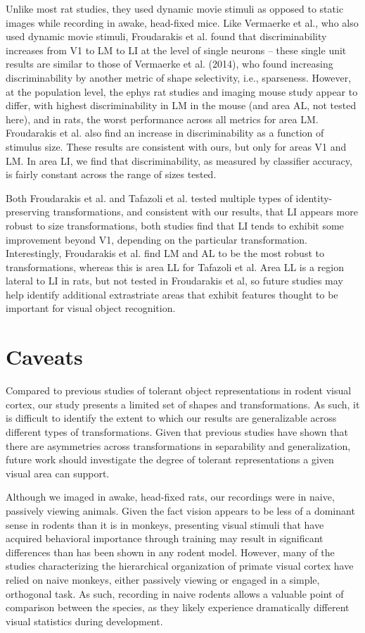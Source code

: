 Unlike most rat studies, they used dynamic movie stimuli as opposed to static images while recording in awake, head-fixed mice. Like Vermaerke et al., who also used dynamic movie stimuli, Froudarakis et al. found that discriminability increases from V1 to LM to LI at the level of single neurons -- these single unit results are similar to those of Vermaerke et al. (2014), who found increasing discriminability by another metric of shape selectivity, i.e., sparseness. However, at the population level, the ephys rat studies and imaging mouse study appear to differ, with highest discriminability in LM in the mouse (and area AL, not tested here), and in rats, the worst performance across all metrics for area LM. Froudarakis et al. also find an increase in discriminability as a function of stimulus size. These results are consistent with ours, but only for areas V1 and LM. In area LI, we find that discriminability, as measured by classifier accuracy, is fairly constant across the range of sizes tested. 

Both Froudarakis et al. and Tafazoli et al. tested multiple types of identity-preserving transformations, and consistent with our results, that LI appears more robust to size transformations, both studies find that LI tends to exhibit some improvement beyond V1, depending on the particular transformation. Interestingly, Froudarakis et al. find LM and AL to be the most robust to transformations, whereas this is area LL for Tafazoli et al. Area LL is a region lateral to LI in rats, but not tested in Froudarakis et al, so future studies may help identify additional extrastriate areas that exhibit features thought to be important for visual object recognition.  

\section{Caveats}
Compared to previous studies of tolerant object representations in rodent visual cortex, our study presents a limited set of shapes and transformations. As such, it is difficult to identify the extent to which our results are generalizable across different types of transformations. Given that previous studies have shown that there are asymmetries across transformations in separability and generalization, future work should investigate the degree of tolerant representations a given visual area can support. 

Although we imaged in awake, head-fixed rats, our recordings were in naive, passively viewing animals. Given the fact vision appears to be less of a dominant sense in rodents than it is in monkeys, presenting visual stimuli that have acquired behavioral importance through training may result in significant differences than has been shown in any rodent model. However, many of the studies characterizing the hierarchical organization of primate visual cortex have relied on naive monkeys, either passively viewing or engaged in a simple, orthogonal task\cite{REFREF}. As such, recording in naive rodents allows a valuable point of comparison between the species, as they likely experience dramatically different visual statistics during development.

